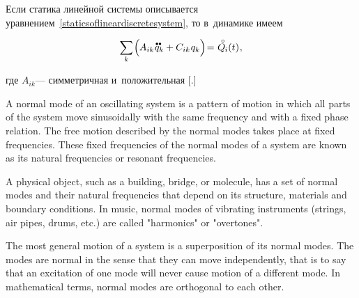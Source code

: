 \label{para:smalloscillations}

\begin{otherlanguage}{russian}

Если статика линейной системы описывается уравнением~\eqref{staticsoflineardiscretesystem}, то в~динамике имеем

\nopagebreak\vspace{-0.4em}\begin{equation}\label{dynamicsoflineardiscretesystem}
\scalebox{0.95}[1]{$\displaystyle \sum_{\smash{k}}$} \hspace{-0.2ex} \left(^{\mathstrut} \hspace{-0.2ex} A_{ik} \hspace{.12ex} \mathdotdotabove{q}_k + C_{ik} \hspace{.12ex} q_k \right) \hspace{-0.4ex}
= \hspace{.1ex} \mathcircabove{Q}_{\hspace{-0.1ex}i}(t) \hspace{.1ex} ,
\vspace{-0.1em}\end{equation}

\vspace{-0.25em} \noindent где ${A_{ik}}$\:--- симметричная и~положительная [.]

{\small%
A normal mode of an oscillating system is a pattern of motion in which all parts of the system move sinusoidally with the same frequency and with a fixed phase relation. The free motion described by the normal modes takes place at fixed frequencies. These fixed frequencies of the normal modes of a system are known as its natural frequencies or resonant frequencies.

A physical object, such as a building, bridge, or molecule, has a set of normal modes and their natural frequencies that depend on its structure, materials and boundary conditions. In music, normal modes of vibrating instruments (strings, air pipes, drums, etc.) are called "harmonics" or "overtones".

The most general motion of a system is a superposition of its normal modes. The modes are normal in the sense that they can move independently, that is to say that an excitation of one mode will never cause motion of a different mode. In mathematical terms, normal modes are orthogonal to each other.
\par}


\end{otherlanguage}
